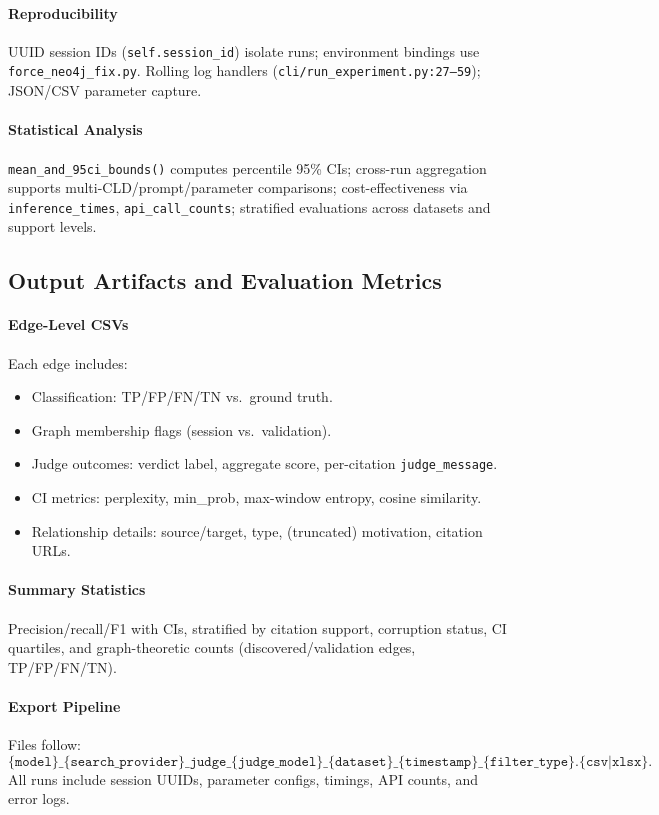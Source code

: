 \paragraph{Reproducibility}
UUID session IDs (\texttt{self.session\_id}) isolate runs; environment bindings use \texttt{force\_neo4j\_fix.py}. Rolling log handlers (\texttt{cli/run\_experiment.py:27--59}); JSON/CSV parameter capture.

\paragraph{Statistical Analysis}
\texttt{mean\_and\_95ci\_bounds()} computes percentile 95\% CIs; cross-run aggregation supports multi-CLD/prompt/parameter comparisons; cost-effectiveness via \texttt{inference\_times}, \texttt{api\_call\_counts}; stratified evaluations across datasets and support levels.

\subsection{Output Artifacts and Evaluation Metrics}

\paragraph{Edge-Level CSVs}
Each edge includes:
\begin{itemize}
  \item Classification: TP/FP/FN/TN vs.\ ground truth.
  \item Graph membership flags (session vs.\ validation).
  \item Judge outcomes: verdict label, aggregate score, per-citation \texttt{judge\_message}.
  \item CI metrics: perplexity, min\_prob, max-window entropy, cosine similarity.
  \item Relationship details: source/target, type, (truncated) motivation, citation URLs.
\end{itemize}

\paragraph{Summary Statistics}
Precision/recall/F1 with CIs, stratified by citation support, corruption status, CI quartiles, and graph-theoretic counts (discovered/validation edges, TP/FP/FN/TN).

\paragraph{Export Pipeline}
Files follow:
\[
\{\texttt{model}\}\_\{\texttt{search\_provider}\}\_\texttt{judge}\_\{\texttt{judge\_model}\}\_\{\texttt{dataset}\}\_\{\texttt{timestamp}\}\_\{\texttt{filter\_type}\}. \{\texttt{csv}|\texttt{xlsx}\}.
\]
All runs include session UUIDs, parameter configs, timings, API counts, and error logs.

